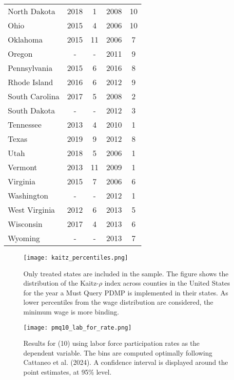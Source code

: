 \documentclass[12pt,a4paper]{article}
\begin{document}
\begin{longtable}[c]{lcccc}
    North Dakota & 2018 & 1 & 2008 & 10 \\
    Ohio & 2015 & 4 & 2006 & 10 \\
    Oklahoma & 2015 & 11 & 2006 & 7 \\
    Oregon & - & - & 2011 & 9 \\
    Pennsylvania & 2015 & 6 & 2016 & 8 \\
    Rhode Island & 2016 & 6 & 2012 & 9 \\
    South Carolina & 2017 & 5 & 2008 & 2 \\
    South Dakota & - & - & 2012 & 3 \\
    Tennessee & 2013 & 4 & 2010 & 1 \\
    Texas & 2019 & 9 & 2012 & 8 \\
    Utah & 2018 & 5 & 2006 & 1 \\
    Vermont & 2013 & 11 & 2009 & 1 \\
    Virginia & 2015 & 7 & 2006 & 6 \\
    Washington & - & - & 2012 & 1 \\
    West Virginia & 2012 & 6 & 2013 & 5 \\
    Wisconsin & 2017 & 4 & 2013 & 6 \\
    Wyoming & - & - & 2013 & 7 \\

\end{longtable}

\newpage

\begin{figure}[htbp]
    \centering
    \texttt{[image: kaitz\_percentiles.png]}
    \caption{Only treated states are included in the sample. The figure shows the distribution of the Kaitz-\(\rho\) index across counties in the United States for the year a Must Query PDMP is implemented in their states. As lower percentiles from the wage distribution are considered, the minimum wage is more binding.}
    \label{fig:kaitz_perc}
\end{figure}

\newpage

\begin{figure}[htbp]
    \centering
    \texttt{[image: pmq10\_lab\_for\_rate.png]}
    \caption{Results for (10) using labor force participation rates as the dependent variable. The bins are computed optimally following Cattaneo et al. (2024). A confidence interval is displayed around the point estimates, at 95\% level.}
    \label{fig:lab_for_rate}
\end{figure}
\end{document}
